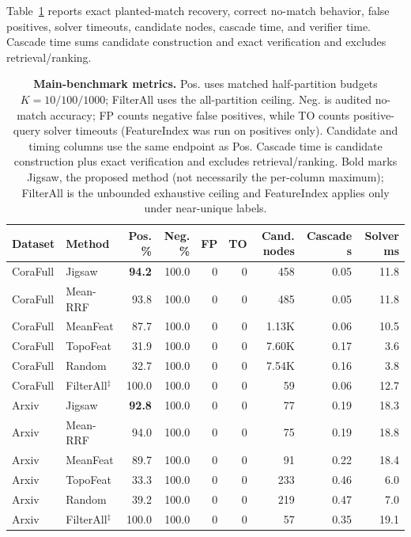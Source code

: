 \documentclass[sigconf, nonacm]{acmart}
\begin{document}
Table~\ref{tab:production_matrix} reports exact planted-match recovery, correct no-match behavior, false positives, solver timeouts, candidate nodes, cascade time, and verifier time. Cascade time sums candidate construction and exact verification and excludes retrieval/ranking.

\begin{table}[t]
\centering
\caption{\textbf{Main-benchmark metrics.} Pos. uses matched half-partition budgets $K{=}10/100/1000$; FilterAll uses the all-partition ceiling. Neg. is audited no-match accuracy; FP counts negative false positives, while TO counts positive-query solver timeouts (FeatureIndex was run on positives only). Candidate and timing columns use the same endpoint as Pos. Cascade time is candidate construction plus exact verification and excludes retrieval/ranking. Bold marks Jigsaw, the proposed method (not necessarily the per-column maximum); FilterAll is the unbounded exhaustive ceiling and FeatureIndex applies only under near-unique labels.}
\label{tab:production_matrix}
\setlength{\tabcolsep}{6pt}
\small
\begin{tabular}{llrrrrrrr}
\toprule
\textbf{Dataset} & \textbf{Method} & \textbf{Pos. \%} & \textbf{Neg. \%} & \textbf{FP} & \textbf{TO} & \textbf{Cand. nodes} & \textbf{Cascade s} & \textbf{Solver ms} \\
\midrule
CoraFull & Jigsaw & \textbf{94.2} & 100.0 & 0 & 0 & 458 & 0.05 & 11.8 \\
CoraFull & Mean-RRF & 93.8 & 100.0 & 0 & 0 & 485 & 0.05 & 11.8 \\
CoraFull & MeanFeat & 87.7 & 100.0 & 0 & 0 & 1.13K & 0.06 & 10.5 \\
CoraFull & TopoFeat & 31.9 & 100.0 & 0 & 0 & 7.60K & 0.17 & 3.6 \\
CoraFull & Random & 32.7 & 100.0 & 0 & 0 & 7.54K & 0.16 & 3.8 \\
CoraFull & FilterAll$^\ddagger$ & 100.0 & 100.0 & 0 & 0 & 59 & 0.06 & 12.7 \\
\midrule
Arxiv & Jigsaw & \textbf{92.8} & 100.0 & 0 & 0 & 77 & 0.19 & 18.3 \\
Arxiv & Mean-RRF & 94.0 & 100.0 & 0 & 0 & 75 & 0.19 & 18.8 \\
Arxiv & MeanFeat & 89.7 & 100.0 & 0 & 0 & 91 & 0.22 & 18.4 \\
Arxiv & TopoFeat & 33.3 & 100.0 & 0 & 0 & 233 & 0.46 & 6.0 \\
Arxiv & Random & 39.2 & 100.0 & 0 & 0 & 219 & 0.47 & 7.0 \\
Arxiv & FilterAll$^\ddagger$ & 100.0 & 100.0 & 0 & 0 & 57 & 0.35 & 19.1 \\

\end{tabular}
\end{table}
\end{document}
